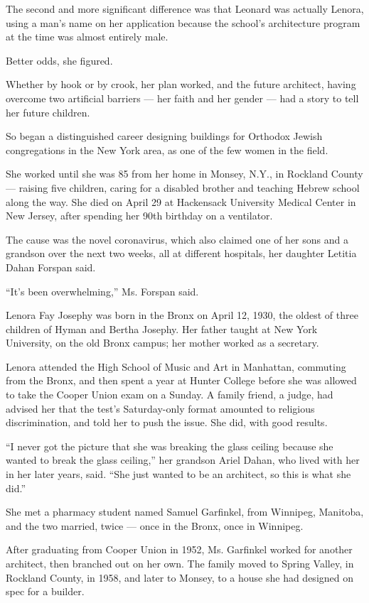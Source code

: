 The second and more significant difference was that Leonard was actually
Lenora, using a man's name on her application because the school's
architecture program at the time was almost entirely male.

Better odds, she figured.

Whether by hook or by crook, her plan worked, and the future architect,
having overcome two artificial barriers --- her faith and her gender ---
had a story to tell her future children.

So began a distinguished career designing buildings for Orthodox Jewish
congregations in the New York area, as one of the few women in the
field.

She worked until she was 85 from her home in Monsey, N.Y., in Rockland
County --- raising five children, caring for a disabled brother and
teaching Hebrew school along the way. She died on April 29 at Hackensack
University Medical Center in New Jersey, after spending her 90th
birthday on a ventilator.

The cause was the novel coronavirus, which also claimed one of her sons
and a grandson over the next two weeks, all at different hospitals, her
daughter Letitia Dahan Forspan said.

``It's been overwhelming,'' Ms. Forspan said.

Lenora Fay Josephy was born in the Bronx on April 12, 1930, the oldest
of three children of Hyman and Bertha Josephy. Her father taught at New
York University, on the old Bronx campus; her mother worked as a
secretary.

Lenora attended the High School of Music and Art in Manhattan, commuting
from the Bronx, and then spent a year at Hunter College before she was
allowed to take the Cooper Union exam on a Sunday. A family friend, a
judge, had advised her that the test's Saturday-only format amounted to
religious discrimination, and told her to push the issue. She did, with
good results.

``I never got the picture that she was breaking the glass ceiling
because she wanted to break the glass ceiling,'' her grandson Ariel
Dahan, who lived with her in her later years, said. ``She just wanted to
be an architect, so this is what she did.''

She met a pharmacy student named Samuel Garfinkel, from Winnipeg,
Manitoba, and the two married, twice --- once in the Bronx, once in
Winnipeg.

After graduating from Cooper Union in 1952, Ms. Garfinkel worked for
another architect, then branched out on her own. The family moved to
Spring Valley, in Rockland County, in 1958, and later to Monsey, to a
house she had designed on spec for a builder.

